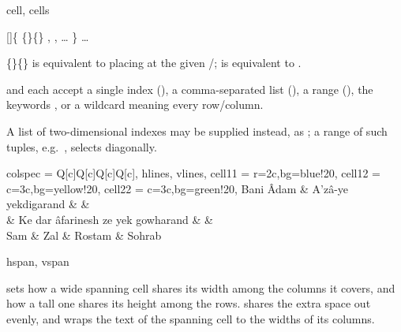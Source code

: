 \begin{codedescribe}[keys]{cell, cells}
  \begin{codesyntax}
    []\{
        \quad{}\{\}\{\}  ,
        \quad{},
        \quad\ldots
        \}
        \quad\ldots
        \tsmacro{\end{tblr}}{}
  \end{codesyntax}
  \{\}\{\} is equivalent to placing  at the given /;  is equivalent to .
  \begin{tsremark}
     and  each accept a single index (), a comma-separated list (), a range (), the keywords , or a wildcard \vrb{-} meaning every row/column.
  \end{tsremark}
  \begin{tsremark}
    A list of two-dimensional indexes may be supplied instead, as ; a range of such tuples, e.g.\ , selects diagonally.
  \end{tsremark}
\end{codedescribe}

\begin{codestore}[st = cell-spanning]
  \begin{tblr}{
    colspec = {Q[c]Q[c]Q[c]Q[c]},
    hlines, vlines,
    cell{1}{1} = {r=2}{c,bg=blue!20},
    cell{1}{2} = {c=3}{c,bg=yellow!20},
    cell{2}{2} = {c=3}{c,bg=green!20},
    }
    Bani Âdam & A’zâ-ye yekdigarand               &        &        \\
              & Ke dar âfarinesh ze yek gowharand &        &        \\
    Sam       & Zal                               & Rostam & Sohrab
  \end{tblr}
\end{codestore}

\begin{center}
\end{center}

\begin{codedescribe}[keys]{hspan, vspan}
  \begin{codesyntax}
  \end{codesyntax}
   sets how a wide spanning cell shares its width among the columns it covers, and  how a tall one shares its height among the rows.  shares the extra space out evenly, and  wraps the text of the spanning cell to the widths of its columns.
\end{codedescribe}

